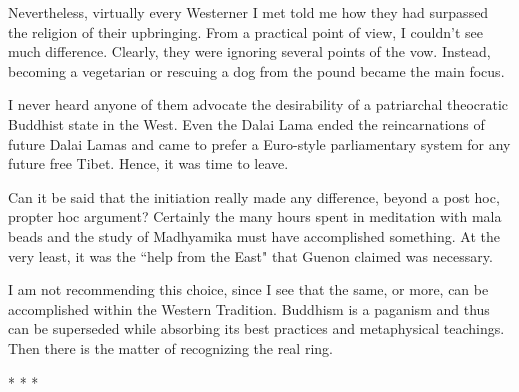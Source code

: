 Nevertheless, virtually every Westerner I met told me how they had surpassed the religion of their upbringing. From a practical point of view, I couldn't see much difference. Clearly, they were ignoring several points of the vow. Instead, becoming a vegetarian or rescuing a dog from the pound became the main focus.

I never heard anyone of them advocate the desirability of a patriarchal theocratic Buddhist state in the West. Even the Dalai Lama ended the reincarnations of future Dalai Lamas and came to prefer a Euro-style parliamentary system for any future free Tibet. Hence, it was time to leave.

Can it be said that the initiation really made any difference, beyond a post hoc, propter hoc argument? Certainly the many hours spent in meditation with mala beads and the study of Madhyamika must have accomplished something. At the very least, it was the ``help from the East" that Guenon claimed was necessary.

I am not recommending this choice, since I see that the same, or more, can be accomplished within the Western Tradition. Buddhism is a paganism and thus can be superseded while absorbing its best practices and metaphysical teachings. Then there is the matter of recognizing the real ring.




\begin{center}* * *\end{center}

